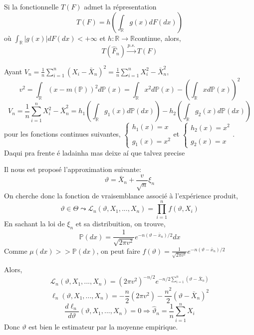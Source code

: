 \documentclass{article}
\begin{document}
Si la fonctionnelle $\displaystyle T(F)$ admet la répresentation
$$T(F)=h\left(\int_{\mathbb{R}}g(x)dF(dx)\right)$$
où $\displaystyle \int_{\mathbb{R}}|g(x)|dF(dx)<+\infty$ et $\displaystyle h: \mathbb{R}\rightarrow\mathbb{R}$continue, alors,
$$ T(\hat F_n)\overset{p.s.}{\longrightarrow}T(F)$$
\vspace{0.2in}

Ayant $\displaystyle V_n=\frac{1}{n}\sum_{i=1}^n(X_i -\bar X_ n)^2=\frac{1}{n}\sum_{i=1}^nX_i^2-\bar X_n^2$,
$$v^2=\int_{\mathbb{R}}(x-m(\mathbb{P}))^2d\mathbb{P}(x)=\int_{\mathbb{R}}x^2d\mathbb{P}(x)-\left({\int_{\mathbb{R}}xd\mathbb{P}(x)}\right)^2$$
$$V_n=\frac{1}{n}\sum_{i=1}^nX_i^2-\bar X_n^2=h_1\left(\int_{\mathbb{R}}g_1(x)d\mathbb{P}(dx)\right)-h_2\left(\int_{\mathbb{R}}g_2(x)d\mathbb{P}(dx)\right)$$
pour les fonctions continues suivantes,
$ \left\{
\begin{array}{ll}
\displaystyle h_1(x)=x \\ \\
\displaystyle g_1(x)=x^2
\end{array}
\right.
$et
$ \left\{
\begin{array}{ll}
\displaystyle h_2(x)=x^2 \\ \\
\displaystyle g_2(x)=x
\end{array}
\right.
$.
\\ {\Huge Daqui pra frente é ladainha mas deixe aí que talvez precise}


Il nous est proposé l'approximation suivante:
$$\vartheta=\bar X_n + \frac{v}{\sqrt{n}}\xi_n$$
On cherche donc la fonction de vraisemblance associé à l'expérience produit,
$$\vartheta \in \Theta \leadsto \mathcal{L}_n(\vartheta,X_1,...,X_n )= \prod_{i=1}^nf(\vartheta,X_i) $$
En sachant la loi de $\displaystyle \xi_n$ et sa distribuition, on trouve,
$$\mathbb{P}(dx)=\frac{1}{\sqrt{2\pi v^2}}e^{-n(\vartheta-\bar x_n)/2}dx$$
Comme $\displaystyle \mu(dx)>> \mathbb{P}(dx)$, on peut faire $\displaystyle f(\vartheta)=\frac{1}{\sqrt{2\pi v^2}}e^{-n(\vartheta-\bar x_n)/2}$

Alors,
$$\mathcal{L}_n(\vartheta,X_1,...,X_n )=(2\pi v^2)^{-n/2}e^{-n/2\sum_{i=1}^n(\vartheta - \bar X_ n)}$$
$$\ell_n(\vartheta,X_1,...,X_n )=-\frac{n}{2}(2\pi v^2)-\frac{n^2}{2}(\vartheta-\bar X_n)^2$$
$$\frac{d\ell_n}{d\vartheta}(\vartheta,X_1,...,X_n )=0 \Rightarrow\hat \vartheta_n=\frac{1}{n}\sum_{i=1}^nX_i$$
Donc $\displaystyle \vartheta$ est bien le estimateur par la moyenne empirique.
\end{document}
